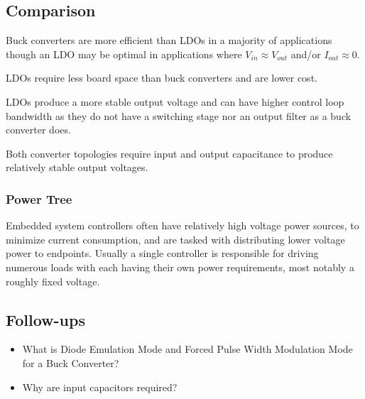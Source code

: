 \documentclass[main.tex]{subfiles}
\begin{document}
\subsection{Comparison}

Buck converters are more efficient than LDOs in a majority of applications though an LDO may be optimal in applications where $V_{in} \approx V_{out}$ and/or $I_{out} \approx 0$. 

LDOs require less board space than buck converters and are lower cost. 

LDOs produce a more stable output voltage and can have higher control loop bandwidth as they do not have a switching stage nor an output filter as a buck converter does. 

Both converter topologies require input and output capacitance to produce relatively stable output voltages.

\subsubsection{Power Tree}
Embedded system controllers often have relatively high voltage power sources, to minimize current consumption, and are tasked with distributing lower voltage power to endpoints. Usually a single controller is responsible for driving numerous loads with each having their own power requirements, most notably a roughly fixed voltage. 

\subsection{Follow-ups}
\begin{itemize}
    \item What is Diode Emulation Mode and Forced Pulse Width Modulation Mode for a Buck Converter?
    \item Why are input capacitors required?
\end{itemize}
\end{document}
